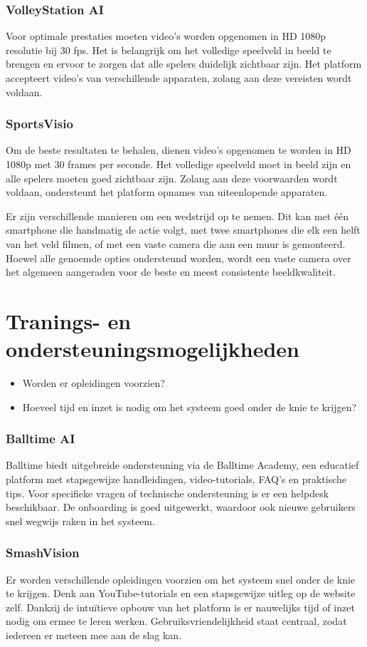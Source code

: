 \subsubsection{VolleyStation AI}
Voor optimale prestaties moeten video's worden opgenomen in HD 1080p resolutie bij 30 fps. Het is belangrijk om het volledige speelveld in beeld te brengen en ervoor te zorgen dat alle spelers duidelijk zichtbaar zijn. Het platform accepteert video's van verschillende apparaten, zolang aan deze vereisten wordt voldaan. 
\subsubsection{SportsVisio}
Om de beste resultaten te behalen, dienen video's opgenomen te worden in HD 1080p met 30 frames per seconde. Het volledige speelveld moet in beeld zijn en alle spelers moeten goed zichtbaar zijn. Zolang aan deze voorwaarden wordt voldaan, ondersteunt het platform opnames van uiteenlopende apparaten.

Er zijn verschillende manieren om een wedstrijd op te nemen. Dit kan met één smartphone die handmatig de actie volgt, met twee smartphones die elk een helft van het veld filmen, of met een vaste camera die aan een muur is gemonteerd. Hoewel alle genoemde opties ondersteund worden, wordt een vaste camera over het algemeen aangeraden voor de beste en meest consistente beeldkwaliteit.

\section{Tranings- en ondersteuningsmogelijkheden}
\begin{itemize}
  \item Worden er opleidingen voorzien?
  \item Hoeveel tijd en inzet is nodig om het systeem goed onder de knie te krijgen?
\end{itemize}
\subsubsection{Balltime AI}
Balltime biedt uitgebreide ondersteuning via de Balltime Academy, een educatief platform met stapsgewijze handleidingen, video-tutorials, FAQ’s en praktische tips. Voor specifieke vragen of technische ondersteuning is er een helpdesk beschikbaar. De onboarding is goed uitgewerkt, waardoor ook nieuwe gebruikers snel wegwijs raken in het systeem.
\subsubsection{SmashVision}
Er worden verschillende opleidingen voorzien om het systeem snel onder de knie te krijgen. Denk aan YouTube-tutorials en een stapsgewijze uitleg op de website zelf. Dankzij de intuïtieve opbouw van het platform is er nauwelijks tijd of inzet nodig om ermee te leren werken. Gebruiksvriendelijkheid staat centraal, zodat iedereen er meteen mee aan de slag kan.
